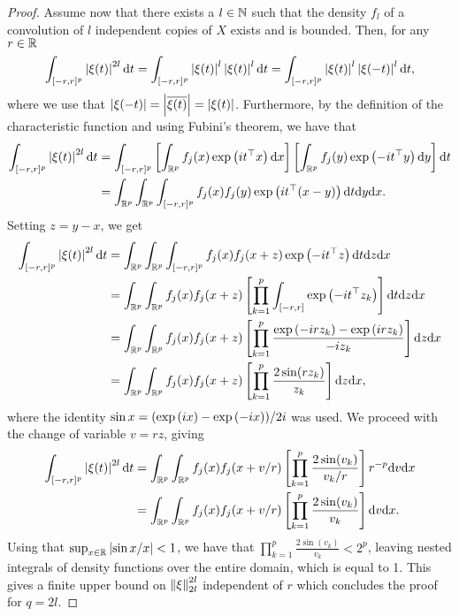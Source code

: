 \begin{proof}
    Assume now that there exists a $l \in \N$ such that the density $f_l$ of a convolution of $l$ independent copies of $X$ exists and is bounded. Then, for any $r \in \R$
    \begin{equation*}
        \int_{[-r, r]^p} \abs{\xi(t)}^{2l} \d t
        = \int_{[-r, r]^p} \abs{\xi(t)}^l\abs{\xi(t)}^l \d t
        = \int_{[-r, r]^p} \abs{\xi(t)}^l\abs{\xi(-t)}^l \d t,
    \end{equation*}
    where we use that $\abs{\xi(-t)} = \abs{\overline{\xi(t)}} = \abs{\xi(t)}$. Furthermore, by the definition of the characteristic function and using Fubini's theorem, we have that
    \begin{align*}
        \int_{[-r, r]^p} \abs{\xi(t)}^{2l} \d t
        &= \int_{[-r, r]^p} \left[\intRp{x}{f_j(x)\expf{it^\top x}}\right]\left[\intRp{y}{f_j(y)\expf{-it^\top y}}\right] \d t\\
        &= \intRp{x}{\intRp{y}{\int_{[-r, r]^p} f_j(x)f_j(y)\expf{it^\top (x - y)}\d t}}.
    \end{align*}
    Setting $z = y - x$, we get
    \begin{align*}
        \int_{[-r, r]^p} \abs{\xi(t)}^{2l} \d t
        &= \intRp{x}{\intRp{z}{\int_{[-r, r]^p} f_j(x)f_j(x + z)\expf{-it^\top z}\d t}}\\
        &= \intRp{x}{\intRp{z}{f_j(x)f_j(x + z)\left[\prod_{k=1}^p \int_{[-r, r]}\expf{-it^\top z_k}\right]\d t}}\\
        &= \intRp{x}{\intRp{z}{f_j(x)f_j(x + z)\left[\prod_{k=1}^p \frac{\expf{-irz_k} - \expf{irz_k}}{-iz_k} \right]}}\\
        &= \intRp{x}{\intRp{z}{f_j(x)f_j(x + z)\left[\prod_{k=1}^p \frac{2 \sin(rz_k)}{z_k} \right]}},
    \end{align*}
    where the identity $\sin x = (\expf{ix} - \expf{-ix}) / 2i$ was used. We proceed with the change of variable $v = r z$, giving
    \begin{align*}
        \int_{[-r, r]^p} \abs{\xi(t)}^{2l} \d t
        &= \intRp{x}{\intRp{v}{f_j(x)f_j(x + v/r)\left[\prod_{k=1}^p \frac{2 \sin(v_k)}{v_k/r} \right] r^{-p}}}\\
        &= \intRp{x}{\intRp{v}{f_j(x)f_j(x + v/r)\left[\prod_{k=1}^p \frac{2 \sin(v_k)}{v_k} \right]}}.
    \end{align*}
    Using that $\sup_{x \in \R} \abs{\sin x / x} < 1$, we have that $\prod_{k=1}^p \frac{2 \sin(v_k)}{v_k} < 2^p$, leaving nested integrals of density functions over the entire domain, which is equal to 1. This gives a finite upper bound on $\norm{\xi}_{2l}^{2l}$ independent of $r$ which concludes the proof for $q = 2l$.
\end{proof}